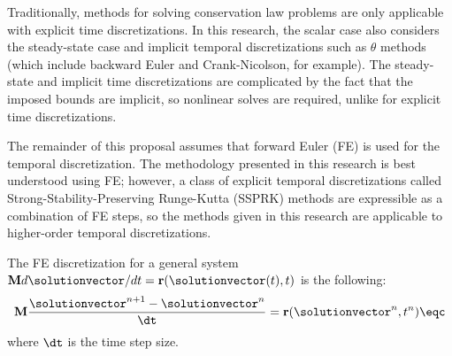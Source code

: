 Traditionally, methods for solving conservation law problems are only
applicable with explicit time discretizations. In this research, the
scalar case also considers the steady-state case and implicit
temporal discretizations such as $\theta$ methods (which include backward
Euler and Crank-Nicolson, for example). The steady-state and implicit time
discretizations are complicated by the fact that the
imposed bounds are implicit, so nonlinear solves are required, unlike
for explicit time discretizations.

The remainder of this proposal assumes that forward Euler (FE) is used for the
temporal discretization. The methodology presented in this research is best
understood using FE; however, a class of explicit temporal discretizations
called Strong-Stability-Preserving Runge-Kutta (SSPRK) methods are expressible
as a combination of FE steps, so the methods given in this research are
applicable to higher-order temporal discretizations.

The FE discretization for a general system $\mathbf{M}d\solutionvector/dt=
\mathbf{r}(\solutionvector(t),t)$ is the following:
\begin{equation}
  \mathbf{M}\frac{\solutionvector^{n+1}-\solutionvector^n}{\dt} =
    \mathbf{r}(\solutionvector^n,t^n) \eqc
\end{equation}
where $\dt$ is the time step size.

